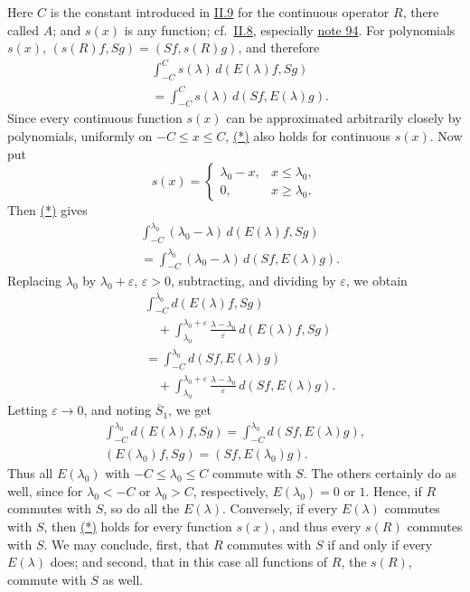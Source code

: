 \documentclass[fontsize=13pt,twoside,openany,headings=normal,parskip=false,bookmarkpackage=false,DIV=calc]{scrbook}
\begin{document}
\hypertarget{origpage-89}{}%
Here $C$ is the constant introduced in \hyperref[sec:II.9]{II.9} for the continuous operator $R$, there called $A$; and $s(x)$ is any function; cf.\ \hyperref[sec:II.8]{II.8}, especially \hyperlink{note-94}{note 94}. For polynomials $s(x)$, $(s(R)f,Sg)=(Sf,s(R)g)$, and therefore
\begin{equation}
\begin{aligned}
&\int_{-C}^Cs(\lambda)\,d(E(\lambda)f,Sg)\\
&=\int_{-C}^Cs(\lambda)\,d(Sf,E(\lambda)g).
\end{aligned}
\tag{*}\label{eq:II.10.star}
\end{equation}
Since every continuous function $s(x)$ can be approximated arbitrarily closely by polynomials, uniformly on $-C\leq x\leq C$, \hyperref[eq:II.10.star]{(*)} also holds for continuous $s(x)$. Now put
\[
s(x)=\begin{cases}\lambda_0-x,&x\leq\lambda_0,\\0,&x\geq\lambda_0.\end{cases}
\]
Then \hyperref[eq:II.10.star]{(*)} gives
\begin{align*}
&\int_{-C}^{\lambda_0}(\lambda_0-\lambda)\,d(E(\lambda)f,Sg)\\
&=\int_{-C}^{\lambda_0}(\lambda_0-\lambda)\,d(Sf,E(\lambda)g).
\end{align*}
Replacing $\lambda_0$ by $\lambda_0+\varepsilon$, $\varepsilon>0$, subtracting, and dividing by $\varepsilon$, we obtain
\begin{align*}
&\int_{-C}^{\lambda_0}d(E(\lambda)f,Sg)\\
&\quad+\int_{\lambda_0}^{\lambda_0+\varepsilon}\frac{\lambda-\lambda_0}{\varepsilon}\,d(E(\lambda)f,Sg)\\
&=\int_{-C}^{\lambda_0}d(Sf,E(\lambda)g)\\
&\quad+\int_{\lambda_0}^{\lambda_0+\varepsilon}\frac{\lambda-\lambda_0}{\varepsilon}\,d(Sf,E(\lambda)g).
\end{align*}
Letting $\varepsilon\to0$, and noting $\hyperref[cond:II.Sbar1]{\overline S_1}$, we get
\begin{gather*}
\int_{-C}^{\lambda_0}d(E(\lambda)f,Sg)=\int_{-C}^{\lambda_0}d(Sf,E(\lambda)g),\\
(E(\lambda_0)f,Sg)=(Sf,E(\lambda_0)g).
\end{gather*}
Thus all $E(\lambda_0)$ with $-C\leq\lambda_0\leq C$ commute with $S$. The others certainly do as well, since for $\lambda_0<-C$ or $\lambda_0>C$, respectively, $E(\lambda_0)=0$ or $1$. Hence, if $R$ commutes with $S$, so do all the $E(\lambda)$. Conversely, if every $E(\lambda)$ commutes with $S$, then \hyperref[eq:II.10.star]{(*)} holds for every function $s(x)$, and thus every $s(R)$ commutes with $S$. We may conclude, first, that $R$ commutes with $S$ if and only if every $E(\lambda)$ does; and second, that in this case all functions of $R$, the $s(R)$, commute with $S$ as well.
\end{document}
